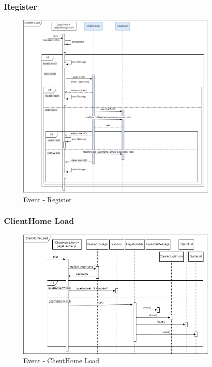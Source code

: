 \documentclass[a4paper, 12pt]{article}
\begin{document}
\subsubsection{Register}
\begin{figure}[h!]
	\centering
	\includegraphics[width=0.9\textwidth]{RIA_images/RegisterEvent.png}
	\caption{Event - Register}
	\label{figure:RegisterRIA}
\end{figure}
\newpage
\subsubsection{ClientHome Load}
\begin{figure}[h!]
	\centering
	\includegraphics[width=0.9\textwidth]{RIA_images/ClientHomeLoad.png}
	\caption{Event - ClientHome Load}
	\label{figure:ClientHomeLoadRIA}
\end{figure}
\end{document}
